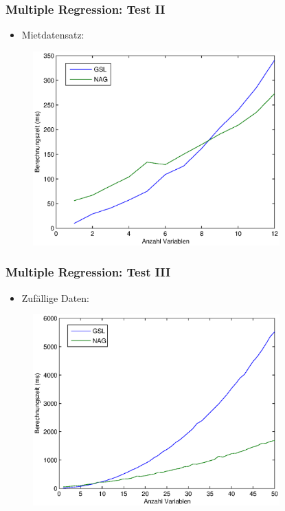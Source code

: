 \documentclass{beamer}
\begin{document}
\begin{frame}
  \frametitle{Multiple Regression: Test II}
  \begin{itemize}
  \item Mietdatensatz:
  \end{itemize}

  \begin{figure}[t]
    \centering
    \includegraphics[width=9.5cm]{figures/multi_reg_vars_2500_obs.eps}
  \end{figure}
\end{frame}

\begin{frame}
  \frametitle{Multiple Regression: Test III}
  \begin{itemize}
  \item Zufällige Daten:
  \end{itemize}

  \begin{figure}[t]
    \centering
    \includegraphics[width=9.5cm]{figures/multi_reg_vars_2500_obs_rand.eps}
  \end{figure}

\end{frame}
\end{document}

